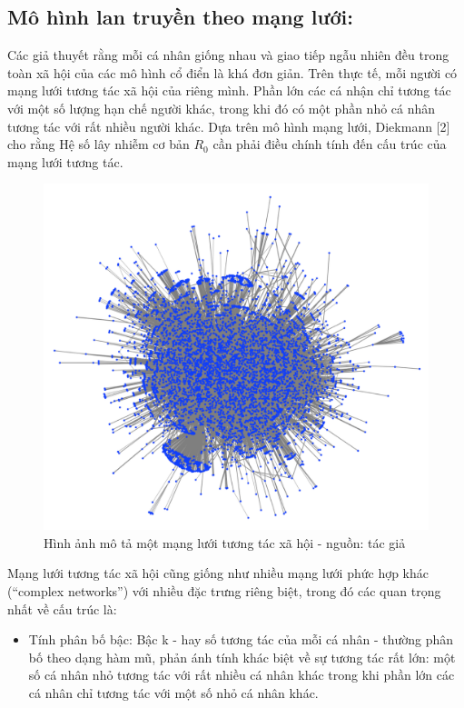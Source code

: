 \documentclass[]{book}
\providecommand{\tightlist}{%
  \setlength{\itemsep}{0pt}\setlength{\parskip}{0pt}}
\begin{document}
\subsection{Mô hình lan truyền theo mạng
lưới:}\label{mo-hinh-lan-truyn-theo-mang-lui}

Các giả thuyết rằng mỗi cá nhân giống nhau và giao tiếp ngẫu nhiên đều
trong toàn xã hội của các mô hình cổ điển là khá đơn giản. Trên thực tế,
mỗi người có mạng lưới tương tác xã hội của riêng mình. Phần lớn các cá
nhận chỉ tương tác với một số lượng hạn chế người khác, trong khi đó có
một phần nhỏ cá nhân tương tác với rất nhiều người khác. Dựa trên mô
hình mạng lưới, Diekmann {[}2{]} cho rằng Hệ số lây nhiễm cơ bản \(R_0\)
cần phải điều chính tính đến cấu trúc của mạng lưới tương tác.

\begin{figure}

{\centering \includegraphics[width=0.8\linewidth]{images/bitcoin_LCC} 

}

\caption{Hình ảnh mô tả một mạng lưới tương tác xã hội - nguồn: tác giả}\label{fig:network1}
\end{figure}

Mạng lưới tương tác xã hội cũng giống như nhiều mạng lưới phức hợp khác
(``complex networks'') với nhiều đặc trưng riêng biệt, trong đó các quan
trọng nhất về cấu trúc là:

\begin{itemize}
\tightlist
\item
  Tính phân bố bậc: Bậc k - hay số tương tác của mỗi cá nhân - thường
  phân bố theo dạng hàm mũ, phản ánh tính khác biệt về sự tương tác rất
  lớn: một số cá nhân nhỏ tương tác với rất nhiều cá nhân khác trong khi
  phần lớn các cá nhân chỉ tương tác với một số nhỏ cá nhân khác.
\end{itemize}
\end{document}

